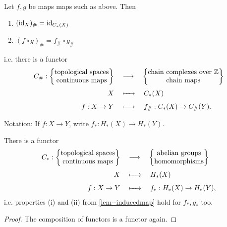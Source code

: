 \documentclass[a4paper,11pt]{article}
\begin{document}
			\begin{lemma}\label{lem--inducedmap}Let $f,g$ be maps maps such as above. Then
				\begin{enumerate}
					\item $(\operatorname{id}_X)_\#=\operatorname{id}_{C_\ast(X)}$
					\item $(f \circ g)_\#=f_\# \circ g_\#$	
				\end{enumerate}
				i.e. there is a functor
				\begin{align*}
					C_\#:\begin{Bmatrix}
						\text{\normalfont topological spaces}\\\text{\normalfont continuous maps}
					\end{Bmatrix}\quad&\longrightarrow\quad
					\begin{Bmatrix}
						\text{\normalfont chain complexes over }\mathbb{Z}\\\text{\normalfont chain maps}
					\end{Bmatrix}\\
					X\quad&\xmapsto{\phantom{kkl}}\quad C_\ast(X)\\
					f:X\rightarrow Y\quad&\xmapsto{\phantom{kkl}}\quad f_\#:C_\ast(X) \rightarrow C_\#(Y).
				\end{align*}
			\end{lemma}
			Notation: If $f:X\rightarrow Y$, write $f_\ast:H_\ast(X)\rightarrow H_\ast(Y)$.

			\begin{cor}\label{cor--inducedmap}
				There is a functor
				\begin{align*}
					C_\ast:\begin{Bmatrix}
						\text{\normalfont topological spaces}\\\text{\normalfont continuous maps}
					\end{Bmatrix}\quad&\longrightarrow\quad
					\begin{Bmatrix}
						\text{\normalfont abelian groups}\\\text{\normalfont homomorphisms}
					\end{Bmatrix}\\
					X\quad&\xmapsto{\phantom{kkl}}\quad H_\ast(X)\\
					f:X\rightarrow Y\quad&\xmapsto{\phantom{kkl}}\quad f_\ast:H_\ast(X) \rightarrow H_\ast(Y),
				\end{align*}
				i.e. properties (i) and (ii) from \autoref{lem--inducedmap} hold for $f_\ast,g_\ast$ too.
			\end{cor}
			\begin{proof}
				The composition of functors is a functor again.
			\end{proof}
\end{document}
